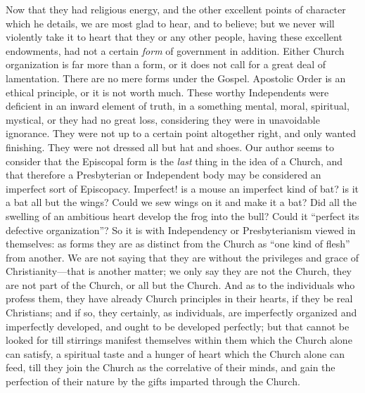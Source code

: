 Now that they had religious energy, and the other
excellent points of character which he details, we are most glad to
hear, and to believe; but we never will violently take it to heart
that they or any other people, having these excellent endowments, had
not a certain \emph{form} of government in addition. Either Church
organization is far more than a form, or it does not call for a great
deal of lamentation. There are no mere forms under the Gospel.
Apostolic Order is an ethical principle, or it is not worth much.
These worthy Independents were deficient in an inward element of
truth, in a something mental, moral, spiritual, mystical, or they had
no great loss, considering they were in unavoidable ignorance. They
were not up to a certain point altogether right, and only wanted
finishing. They were not dressed all but hat and shoes. Our author
seems to consider that the Episcopal form is the \emph{last} thing in the
idea of a Church, and that therefore a Presbyterian or Independent
body may be considered an imperfect sort of Episcopacy. Imperfect! is
a mouse an imperfect kind of bat? is it a bat all but the wings? Could
we sew wings on it and make it a bat? Did all the swelling of an
ambitious heart develop the frog into the bull? Could it ``perfect its
defective organization''? So it is with Independency or Presbyterianism
viewed in themselves: as forms they are as distinct from the Church as
``one kind of flesh'' from another. We are not saying that they are
without the privileges and grace of Christianity—that is another
matter; we only say they are not the Church, they are not part of the
Church, or all but the Church. And as to the individuals who profess
them, they have already Church principles in their hearts, if they be
real Christians; and if so, they certainly, as individuals, are
imperfectly organized and imperfectly developed, and ought to be
developed perfectly; but that cannot be looked for till stirrings
manifest themselves within them which the Church alone can satisfy, a
spiritual taste and a hunger of heart which the Church alone can feed,
till they join the Church as the correlative of their minds, and gain
the perfection of their nature by the gifts imparted through the
Church.

